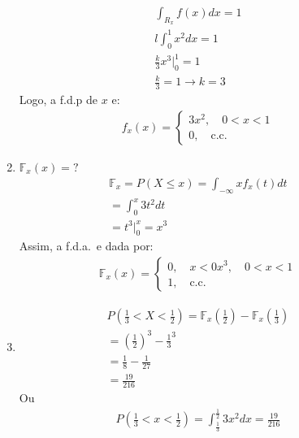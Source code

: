 \begin{description}
\begin{enumerate}[label=(\alph*)]
         \begin{align*}
           \int_{R_x} f(x) dx =1 \\
           l \int_{0}^{1} x^2 dx = 1 \\
           \frac{k}{3} x^3 |^{1}_{0} = 1 \\
           \frac{k}{3}=1 \to k=3
         \end{align*}
         Logo, a f.d.p de $x$ e:
         \begin{align*}
           f_x(x)= \begin{cases}
             3x^2, \quad 0<x<1 \\
             0 , \quad \text{c.c.\ }
           \end{cases}
         \end{align*}
       \item  $\mathbb{F}_{x} (x)= ?$
         \begin{align*}
           \mathbb{F}_{x}= P(X \leq x)= \int_{-\infty}{x} f_{x} (t) dt \\
           = \int_{0}^{x} 3 t^2 dt\\
           = t^3 |^{x}_{0}= x^3
         \end{align*}
         Assim, a f.d.a.\ e dada por:
         \begin{align*}
           \mathbb{F}_x(x)= \begin{cases}
             0 , \quad  x<0
             x^3, \quad 0<x<1 \\
             1 , \quad \text{c.c.\ }
           \end{cases}
         \end{align*}
       \item 
         \begin{align*}
           P( \frac{1}{3}< X < \frac{1}{2} )= \mathbb{F}_{x}(\frac{1}{2} )- \mathbb{F}_{x}(\frac{1}{3})\\
           = (\frac{1}{2})^3 - \frac{1}{3}^3 \\
           = \frac{1}{8} - \frac{1}{27}\\
           = \frac{19}{216}
         \end{align*}
         Ou 
         \begin{align*}
           P( \frac{1}{3}< x < \frac{1}{2} )= \int_{\frac{1}{3}}^{\frac{1}{2}} 3x^2 dx = \frac{19}{216}
         \end{align*}
     \end{enumerate}

\end{description}
